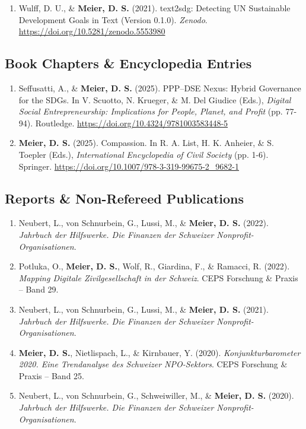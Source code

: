 \documentclass[11pt,letterpaper]{article}
\newcommand{\pubitem}[1]{
    \item #1
}
\begin{document}
\begin{enumerate}[leftmargin=*, itemsep=0.5em, resume]

\pubitem{Wulff, D. U., \& \textbf{Meier, D. S.} (2021). text2sdg: Detecting UN Sustainable Development Goals in Text (Version 0.1.0). \textit{Zenodo}. \href{https://doi.org/10.5281/zenodo.5553980}{https://doi.org/10.5281/zenodo.5553980}}

\end{enumerate}

\subsection*{Book Chapters \& Encyclopedia Entries}

\begin{enumerate}[leftmargin=*, itemsep=0.5em, resume]

\pubitem{Seffusatti, A., \& \textbf{Meier, D. S.} (2025). PPP–DSE Nexus: Hybrid Governance for the SDGs. In V. Scuotto, N. Krueger, \& M. Del Giudice (Eds.), \textit{Digital Social Entrepreneurship: Implications for People, Planet, and Profit} (pp. 77-94). Routledge. \href{https://doi.org/10.4324/9781003583448-5}{https://doi.org/10.4324/9781003583448-5}}

\pubitem{\textbf{Meier, D. S.} (2025). Compassion. In R. A. List, H. K. Anheier, \& S. Toepler (Eds.), \textit{International Encyclopedia of Civil Society} (pp. 1-6). Springer. \href{https://doi.org/10.1007/978-3-319-99675-2_9682-1}{https://doi.org/10.1007/978-3-319-99675-2\_9682-1}}

\end{enumerate}

\subsection*{Reports \& Non-Refereed Publications}

\begin{enumerate}[leftmargin=*, itemsep=0.5em, resume]

\pubitem{Neubert, L., von Schnurbein, G., Lussi, M., \& \textbf{Meier, D. S.} (2022). \textit{Jahrbuch der Hilfswerke. Die Finanzen der Schweizer Nonprofit-Organisationen}.}

\pubitem{Potluka, O., \textbf{Meier, D. S.}, Wolf, R., Giardina, F., \& Ramacci, R. (2022). \textit{Mapping Digitale Zivilgesellschaft in der Schweiz}. CEPS Forschung \& Praxis – Band 29.}

\pubitem{Neubert, L., von Schnurbein, G., Lussi, M., \& \textbf{Meier, D. S.} (2021). \textit{Jahrbuch der Hilfswerke. Die Finanzen der Schweizer Nonprofit-Organisationen}.}

\pubitem{\textbf{Meier, D. S.}, Nietlispach, L., \& Kirnbauer, Y. (2020). \textit{Konjunkturbarometer 2020. Eine Trendanalyse des Schweizer NPO-Sektors}. CEPS Forschung \& Praxis – Band 25.}

\pubitem{Neubert, L., von Schnurbein, G., Schweiwiller, M., \& \textbf{Meier, D. S.} (2020). \textit{Jahrbuch der Hilfswerke. Die Finanzen der Schweizer Nonprofit-Organisationen}.}

\end{enumerate}
\end{document}
